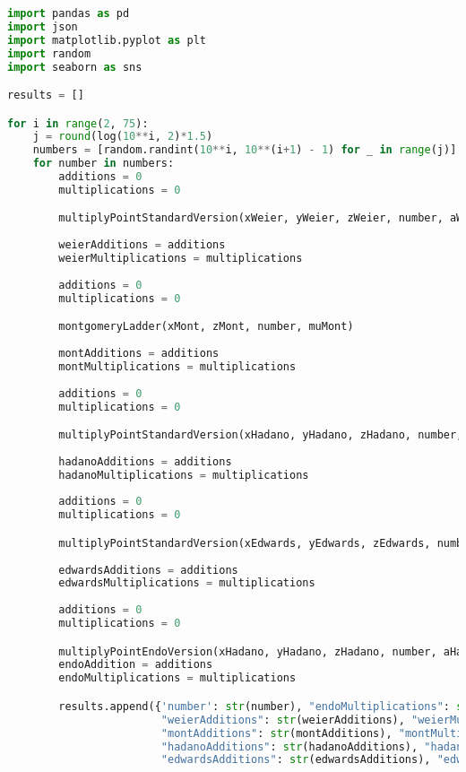 \begin{lstlisting}[language=python]
import pandas as pd
import json
import matplotlib.pyplot as plt
import random
import seaborn as sns

results = []

for i in range(2, 75):
    j = round(log(10**i, 2)*1.5) 
    numbers = [random.randint(10**i, 10**(i+1) - 1) for _ in range(j)]
    for number in numbers:
        additions = 0
        multiplications = 0

        multiplyPointStandardVersion(xWeier, yWeier, zWeier, number, aWeier, bWeier, addTwoPointsWeierstrass)
        
        weierAdditions = additions
        weierMultiplications = multiplications
        
        additions = 0
        multiplications = 0

        montgomeryLadder(xMont, zMont, number, muMont) 
        
        montAdditions = additions
        montMultiplications = multiplications
        
        additions = 0
        multiplications = 0

        multiplyPointStandardVersion(xHadano, yHadano, zHadano, number, aHadano, bHadano, addTwoPointsHadano)
        
        hadanoAdditions = additions
        hadanoMultiplications = multiplications
        
        additions = 0
        multiplications = 0

        multiplyPointStandardVersion(xEdwards, yEdwards, zEdwards, number, eEdwards, dEdwards, addTwoPointsEdwards)
        
        edwardsAdditions = additions
        edwardsMultiplications = multiplications
                
        additions = 0
        multiplications = 0

        multiplyPointEndoVersion(xHadano, yHadano, zHadano, number, aHadano, bHadano, addTwoPointsHadano, endomorphismHadano, sqrt(-3), p)
        endoAddition = additions
        endoMultiplications = multiplications

        results.append({'number': str(number), "endoMultiplications": str(endoMultiplications), "endoAdditions": str(endoAddition),
                        "weierAdditions": str(weierAdditions), "weierMultiplications": str(weierMultiplications), 
                        "montAdditions": str(montAdditions), "montMultiplications": str(montMultiplications),
                        "hadanoAdditions": str(hadanoAdditions), "hadanoMultiplications": str(hadanoMultiplications),
                        "edwardsAdditions": str(edwardsAdditions), "edwardsMultiplications": str(edwardsMultiplications)})        




\end{lstlisting}
